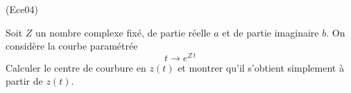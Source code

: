 \begin{tiny}(Ece04)\end{tiny}
Soit $Z$ un nombre complexe fixé, de partie réelle $a$ et de partie imaginaire $b$. On considère la courbe paramétrée 
\begin{displaymath}
 t \rightarrow e^{Z\,t}
\end{displaymath}
Calculer le centre de courbure en $z(t)$ et montrer qu'il s'obtient simplement à partir de $z(t)$.